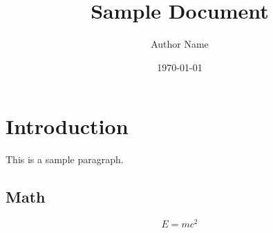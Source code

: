 \documentclass[12pt]{article}
\title{Sample Document}
\author{Author Name}
\date{\today}
\begin{document}
\maketitle

\section{Introduction}
This is a sample paragraph.

\subsection{Math}
\[ E = mc^2 \]
\end{document}
